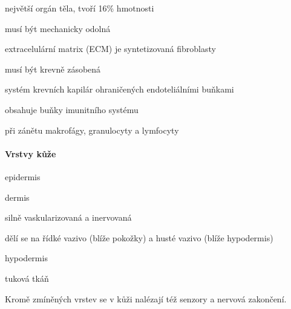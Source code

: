 \documentclass[DIV=8]{scrreprt}
\begin{document}
\begin{myItemize}[nosep]
    \item největší orgán těla, tvoří 16\% hmotnosti
    \item musí být mechanicky odolná
\begin{myItemize}[nosep]
    \item extracelulární matrix (ECM) je syntetizovaná fibroblasty
\end{myItemize}

    \item musí být krevně zásobená
\begin{myItemize}[nosep]
    \item systém krevních kapilár ohraničených endoteliálními buňkami
\end{myItemize}

    \item obsahuje buňky imunitního systému
\begin{myItemize}[nosep]
    \item při zánětu makrofágy, granulocyty a lymfocyty
\end{myItemize}

\end{myItemize}



\paragraph{Vrstvy kůže}
\begin{myItemize}[nosep]
    \item epidermis
    \item dermis
\begin{myItemize}[nosep]
    \item silně vaskularizovaná a inervovaná
    \item dělí se na řídké vazivo (blíže pokožky) a husté vazivo (blíže hypodermis)
\end{myItemize}

    \item hypodermis
\begin{myItemize}[nosep]
    \item tuková tkáň
\end{myItemize}

\end{myItemize}



Kromě zmíněných vrstev se v kůži nalézají též senzory a nervová zakončení.
\end{document}
